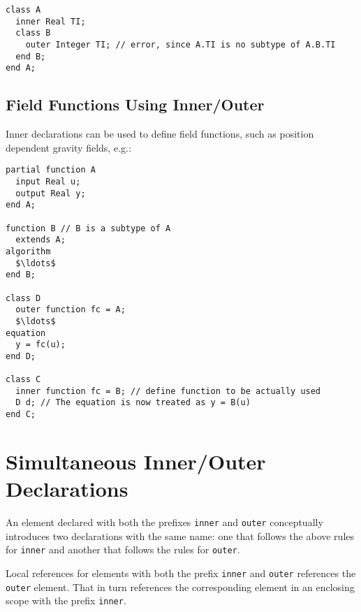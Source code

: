 \begin{example}
\begin{lstlisting}[language=modelica]
class A
  inner Real TI;
  class B
    outer Integer TI; // error, since A.TI is no subtype of A.B.TI
  end B;
end A;
\end{lstlisting}
\end{example}


\subsection{Field Functions Using Inner/Outer}\label{example-of-field-functions-using-inner-outer}\label{field-functions-using-inner-outer}

\begin{nonnormative}
Inner declarations can be used to define field functions, such as position dependent gravity fields, e.g.:
\begin{lstlisting}[language=modelica]
partial function A
  input Real u;
  output Real y;
end A;

function B // B is a subtype of A
  extends A;
algorithm
  $\ldots$
end B;

class D
  outer function fc = A;
  $\ldots$
equation
  y = fc(u);
end D;

class C
  inner function fc = B; // define function to be actually used
  D d; // The equation is now treated as y = B(u)
end C;
\end{lstlisting}
\end{nonnormative}


\section{Simultaneous Inner/Outer Declarations}\label{simultaneous-inner-outer-declarations}

An element declared with both the prefixes \lstinline!inner! and \lstinline!outer! conceptually introduces two declarations with the same name: one that follows the above rules for \lstinline!inner! and another that follows the rules for \lstinline!outer!.

\begin{nonnormative}
Local references for elements with both the prefix \lstinline!inner! and \lstinline!outer! references the \lstinline!outer! element.
That in turn references the corresponding element in an enclosing scope with the prefix \lstinline!inner!.
\end{nonnormative}

